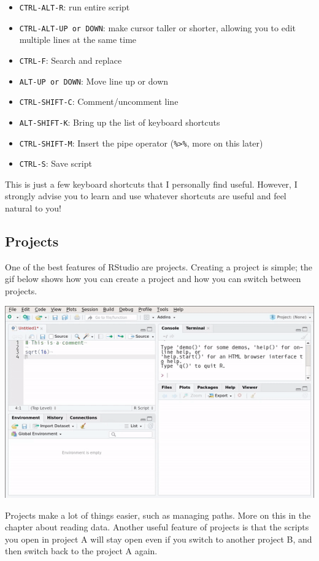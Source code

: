 \documentclass[]{gitbook}
\providecommand{\tightlist}{%
  \setlength{\itemsep}{0pt}\setlength{\parskip}{0pt}}
\begin{document}
\begin{itemize}
\tightlist
\item
  \texttt{CTRL-ALT-R}: run entire script
\item
  \texttt{CTRL-ALT-UP\ or\ DOWN}: make cursor taller or shorter, allowing you to edit multiple lines at the same time
\item
  \texttt{CTRL-F}: Search and replace
\item
  \texttt{ALT-UP\ or\ DOWN}: Move line up or down
\item
  \texttt{CTRL-SHIFT-C}: Comment/uncomment line
\item
  \texttt{ALT-SHIFT-K}: Bring up the list of keyboard shortcuts
\item
  \texttt{CTRL-SHIFT-M}: Insert the pipe operator (\texttt{\%\textgreater{}\%}, more on this later)
\item
  \texttt{CTRL-S}: Save script
\end{itemize}

This is just a few keyboard shortcuts that I personally find useful. However, I strongly advise you
to learn and use whatever shortcuts are useful and feel natural to you!

\hypertarget{projects}{%
\subsection{Projects}\label{projects}}

One of the best features of RStudio are projects. Creating a project is simple; the gif below
shows how you can create a project and how you can switch between projects.

\includegraphics{pics/rstudio_projects.gif}

Projects make a lot of things easier, such as managing paths. More on this in the chapter about
reading data. Another useful feature of projects is that the scripts you open in project A will
stay open even if you switch to another project B, and then switch back to the project A again.
\end{document}
